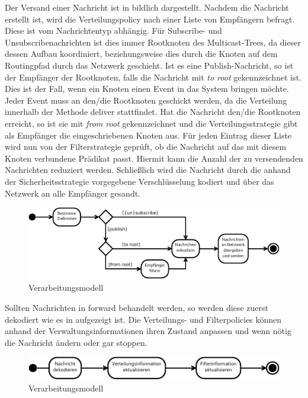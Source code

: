 Der Versand einer Nachricht ist in  bildlich dargestellt. Nachdem die Nachricht erstellt ist, wird die Verteilungspolicy nach einer Liste von Empfängern befragt. Diese ist vom Nachrichtentyp abhängig. Für Subscribe- und Unsubscribenachrichten ist dies immer Rootknoten des Multicast-Trees, da dieser dessen Aufbau koordiniert, beziehungsweise dies durch die Knoten auf dem Routingpfad durch das Netzwerk geschieht. Ist es eine Publish-Nachricht, so ist der Empfänger der Rootknoten, falls die Nachricht mit \emph{to root} gekennzeichnet ist. Dies ist der Fall, wenn ein Knoten einen Event in das System bringen möchte. Jeder Event muss an den/die Rootknoten geschickt werden, da die Verteilung innerhalb der Methode deliver stattfindet. Hat die Nachricht den/die Rootknoten erreicht, so ist sie mit \emph{from root} gekennzeichnet und die Verteilungsstrategie gibt als Empfänger die eingeschriebenen Knoten aus. Für jeden Eintrag dieser Liste wird nun von der Filterstrategie geprüft, ob die Nachricht auf das mit diesem Knoten verbundene Prädikat passt. Hiermit kann die Anzahl der zu versendenden Nachrichten reduziert werden. Schließlich wird die Nachricht durch die anhand der Sicherheitsstrategie vorgegebene Verschlüsselung kodiert und über das Netzwerk an alle Empfänger gesandt.

\begin{figure}[htbp]
\centering
\includegraphics{grafics/processing_send.pdf}
\caption{Verarbeitungsmodell}
\label{fig:processing_send}
\end{figure}

Sollten Nachrichten in forward behandelt werden, so werden diese zuerst dekodiert wie es in  aufgezeigt ist. Die Verteilungs- und Filterpolicies können anhand der Verwaltungsinformationen ihren Zustand anpassen und wenn nötig die Nachricht ändern oder gar stoppen.

\begin{figure}[htbp]
\centering
\includegraphics{grafics/processing_forward.pdf}
\caption{Verarbeitungsmodell}
\label{fig:processing_forward}
\end{figure}

